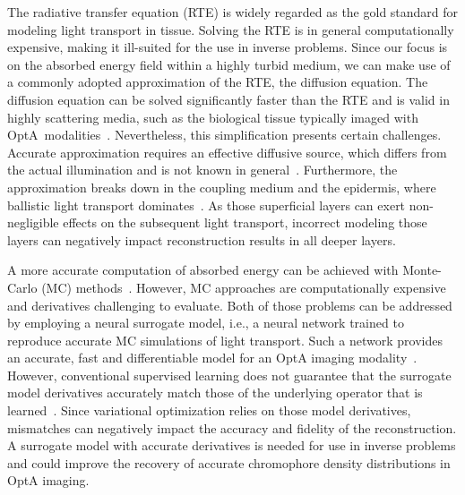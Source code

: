\documentclass[journal,twoside,web]{ieeecolor}
\begin{document}
The radiative transfer equation (RTE) is widely regarded as the gold standard for modeling light transport in tissue. %
Solving the RTE is in general computationally expensive, making it ill-suited for the use in inverse problems. %
Since our focus is on the absorbed energy field within a highly turbid medium, we can make use of a commonly adopted approximation of the RTE, the diffusion equation. %
The diffusion equation can be solved significantly faster than the RTE and is valid in highly scattering media, such as the biological tissue typically imaged with OptA modalities~\cite{Cheong1990}. %
Nevertheless, this simplification presents certain challenges. %
Accurate approximation requires an effective diffusive source, which differs from the actual illumination and is not known in general~\cite{Tarvainen2005}. %
Furthermore, the approximation breaks down in the coupling medium and the epidermis, where ballistic light transport dominates~\cite{Hielscher1998,Aydin2002}. %
As those superficial layers can exert non-negligible effects on the subsequent light transport, incorrect modeling those layers can negatively impact reconstruction results in all deeper layers.\par

A more accurate computation of absorbed energy can be achieved with Monte-Carlo (MC) methods~\cite{Cox2012,Banerjee2010,Fang2009}. %
However, MC approaches are computationally expensive and derivatives challenging to evaluate. %
Both of those problems can be addressed by employing a neural surrogate model, i.e., a neural network trained to reproduce accurate MC simulations of light transport. %
Such a network provides an accurate, fast and differentiable model for an OptA imaging modality~\cite{Mishra2021}. %
However, conventional supervised learning does not guarantee that the surrogate model derivatives accurately match those of the underlying operator that is learned~\cite{Cocola2020}. %
Since variational optimization relies on those model derivatives, mismatches can negatively impact the accuracy and fidelity of the reconstruction. %
A surrogate model with accurate derivatives is needed for use in inverse problems and could improve the recovery of accurate chromophore density distributions in OptA imaging.\par
\end{document}
